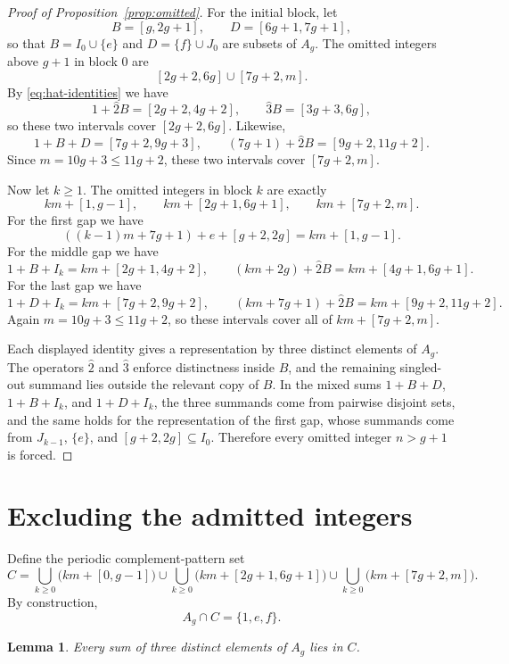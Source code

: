 \documentclass[12pt]{article}
\newtheorem{lemma}[theorem]{Lemma}
\newcommand{\hsum}[1]{\widehat{#1}}
\begin{document}
\begin{proof}[Proof of Proposition~\ref{prop:omitted}]
For the initial block, let
\[
B=[g,2g+1],
\qquad
D=[6g+1,7g+1],
\]
so that $B=I_0\cup\{e\}$ and $D=\{f\}\cup J_0$ are subsets of $A_g$.
The omitted integers above $g+1$ in block $0$ are
\[
[2g+2,6g]\cup[7g+2,m].
\]
By \eqref{eq:hat-identities} we have
\[
1+\hsum{2}B=[2g+2,4g+2],
\qquad
\hsum{3}B=[3g+3,6g],
\]
so these two intervals cover $[2g+2,6g]$. Likewise,
\[
1+B+D=[7g+2,9g+3],
\qquad
(7g+1)+\hsum{2}B=[9g+2,11g+2].
\]
Since $m=10g+3\le 11g+2$, these two intervals cover $[7g+2,m]$.

Now let $k\ge 1$. The omitted integers in block $k$ are exactly
\[
km+[1,g-1],
\qquad
km+[2g+1,6g+1],
\qquad
km+[7g+2,m].
\]
For the first gap we have
\[
((k-1)m+7g+1)+e+[g+2,2g]=km+[1,g-1].
\]
For the middle gap we have
\[
1+B+I_k=km+[2g+1,4g+2],
\qquad
(km+2g)+\hsum{2}B=km+[4g+1,6g+1].
\]
For the last gap we have
\[
1+D+I_k=km+[7g+2,9g+2],
\qquad
(km+7g+1)+\hsum{2}B=km+[9g+2,11g+2].
\]
Again $m=10g+3\le 11g+2$, so these intervals cover all of $km+[7g+2,m]$.

Each displayed identity gives a representation by three distinct elements of $A_g$. The operators $\hsum{2}$ and $\hsum{3}$ enforce distinctness inside $B$, and the remaining singled-out summand lies outside the relevant copy of $B$. In the mixed sums $1+B+D$, $1+B+I_k$, and $1+D+I_k$, the three summands come from pairwise disjoint sets, and the same holds for the representation of the first gap, whose summands come from $J_{k-1}$, $\{e\}$, and $[g+2,2g]\subseteq I_0$. Therefore every omitted integer $n>g+1$ is forced.
\end{proof}

\section{Excluding the admitted integers}\label{sec:included}

Define the periodic complement-pattern set
\[
C=
\bigcup_{k\ge 0}\bigl(km+[0,g-1]\bigr)
\cup
\bigcup_{k\ge 0}\bigl(km+[2g+1,6g+1]\bigr)
\cup
\bigcup_{k\ge 0}\bigl(km+[7g+2,m]\bigr).
\]
By construction,
\begin{equation}\label{eq:A-cap-C}
A_g\cap C=\{1,e,f\}.
\end{equation}

\begin{lemma}\label{lem:sums-in-C}
Every sum of three distinct elements of $A_g$ lies in $C$.
\end{lemma}
\end{document}
